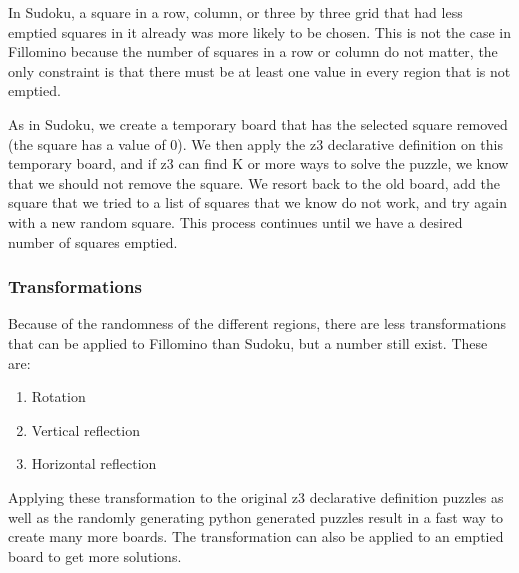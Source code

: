 In Sudoku, a square in a row, column, or three by three grid that had
less emptied squares in it already was more likely to be chosen. This
is not the case in Fillomino because the number of squares in a row or
column do not matter, the only constraint is that there must be at
least one value in every region that is not emptied.
 
As in Sudoku, we create a temporary board that has the selected square
removed (the square has a value of 0). We then apply the z3
declarative definition on this temporary board, and if z3 can find K
or more ways to solve the puzzle, we know that we should not remove
the square. We resort back to the old board, add the square that we
tried to a list of squares that we know do not work, and try again
with a new random square. This process continues until we have a
desired number of squares emptied.


\subsubsection{Transformations}
Because of the randomness of the different regions, there are less
transformations that can be applied to Fillomino than Sudoku, but a
number still exist. These are:

\begin{enumerate}
\item Rotation
\item Vertical reflection
\item Horizontal reflection
\end{enumerate}

Applying these transformation to the original z3 declarative
definition puzzles as well as the randomly generating python generated
puzzles result in a fast way to create many more boards. The
transformation can also be applied to an emptied board to get more
solutions.

